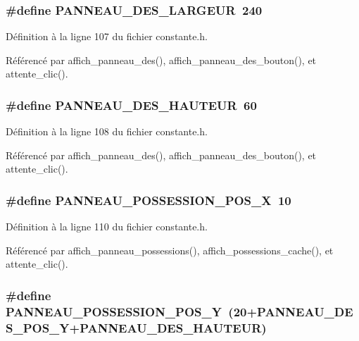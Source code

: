 \subsubsection{\setlength{\rightskip}{0pt plus 5cm}\#define PANNEAU\_\-DES\_\-LARGEUR~240}\label{constante_8h_7bd8706783710b29c8772721eff191fc}




D\'{e}finition \`{a} la ligne 107 du fichier constante.h.

R\'{e}f\'{e}renc\'{e} par affich\_\-panneau\_\-des(), affich\_\-panneau\_\-des\_\-bouton(), et attente\_\-clic().
\subsubsection{\setlength{\rightskip}{0pt plus 5cm}\#define PANNEAU\_\-DES\_\-HAUTEUR~60}\label{constante_8h_dae1822fe97c4a5a01cc76db19acf6e8}




D\'{e}finition \`{a} la ligne 108 du fichier constante.h.

R\'{e}f\'{e}renc\'{e} par affich\_\-panneau\_\-des(), affich\_\-panneau\_\-des\_\-bouton(), et attente\_\-clic().
\subsubsection{\setlength{\rightskip}{0pt plus 5cm}\#define PANNEAU\_\-POSSESSION\_\-POS\_\-X~10}\label{constante_8h_e65867f0f9025c99cd4b064d6072b95d}




D\'{e}finition \`{a} la ligne 110 du fichier constante.h.

R\'{e}f\'{e}renc\'{e} par affich\_\-panneau\_\-possessions(), affich\_\-possessions\_\-cache(), et attente\_\-clic().
\subsubsection{\setlength{\rightskip}{0pt plus 5cm}\#define PANNEAU\_\-POSSESSION\_\-POS\_\-Y~(20+PANNEAU\_\-DES\_\-POS\_\-Y+PANNEAU\_\-DES\_\-HAUTEUR)}\label{constante_8h_107b7d08799f102f4ec3639104d1d978}





